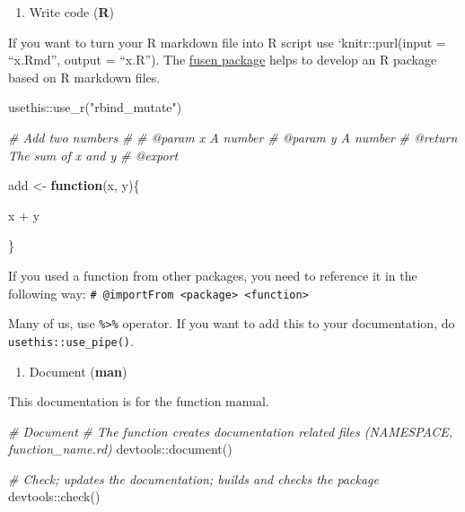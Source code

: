 \documentclass[
]{book}
\newenvironment{Shaded}{\begin{snugshade}}{\end{snugshade}}
\newcommand{\CommentTok}[1]{\textcolor[rgb]{0.56,0.35,0.01}{\textit{#1}}}
\newcommand{\ControlFlowTok}[1]{\textcolor[rgb]{0.13,0.29,0.53}{\textbf{#1}}}
\newcommand{\FunctionTok}[1]{\textcolor[rgb]{0.00,0.00,0.00}{#1}}
\newcommand{\NormalTok}[1]{#1}
\newcommand{\OtherTok}[1]{\textcolor[rgb]{0.56,0.35,0.01}{#1}}
\newcommand{\SpecialCharTok}[1]{\textcolor[rgb]{0.00,0.00,0.00}{#1}}
\newcommand{\StringTok}[1]{\textcolor[rgb]{0.31,0.60,0.02}{#1}}
\providecommand{\tightlist}{%
  \setlength{\itemsep}{0pt}\setlength{\parskip}{0pt}}
\begin{document}
\begin{enumerate}
\def\labelenumi{\arabic{enumi}.}
\setcounter{enumi}{1}
\tightlist
\item
  Write code (\textbf{R})
\end{enumerate}

If you want to turn your R markdown file into R script use `knitr::purl(input = ``x.Rmd'',
output = ``x.R''). The \href{https://thinkr-open.github.io/fusen/}{fusen package} helps to develop an R package based on R markdown files.

\begin{Shaded}
\begin{Highlighting}[]
\NormalTok{usethis}\SpecialCharTok{::}\FunctionTok{use\_r}\NormalTok{(}\StringTok{"rbind\_mutate"}\NormalTok{)}
\end{Highlighting}
\end{Shaded}

\begin{Shaded}
\begin{Highlighting}[]
\CommentTok{\#\textquotesingle{} Add two numbers}
\CommentTok{\#\textquotesingle{}}
\CommentTok{\#\textquotesingle{} @param x A number}
\CommentTok{\#\textquotesingle{} @param y A number}
\CommentTok{\#\textquotesingle{} @return The sum of x and y }
\CommentTok{\#\textquotesingle{} @export}

\NormalTok{add }\OtherTok{\textless{}{-}} \ControlFlowTok{function}\NormalTok{(x, y)\{}
  
\NormalTok{  x }\SpecialCharTok{+}\NormalTok{ y}
  
\NormalTok{\}}
\end{Highlighting}
\end{Shaded}

If you used a function from other packages, you need to reference it in the following way: \texttt{\#\textquotesingle{}\ @importFrom\ \textless{}package\textgreater{}\ \textless{}function\textgreater{}}

Many of us, use \texttt{\%\textgreater{}\%} operator. If you want to add this to your documentation, do \texttt{usethis::use\_pipe()}.

\begin{enumerate}
\def\labelenumi{\arabic{enumi}.}
\setcounter{enumi}{2}
\tightlist
\item
  Document (\textbf{man})
\end{enumerate}

This documentation is for the function manual.

\begin{Shaded}
\begin{Highlighting}[]
\CommentTok{\# Document }
\CommentTok{\# The function creates documentation related files (NAMESPACE, function\_name.rd)}
\NormalTok{devtools}\SpecialCharTok{::}\FunctionTok{document}\NormalTok{()}

\CommentTok{\# Check; updates the documentation; builds and checks the package }
\NormalTok{devtools}\SpecialCharTok{::}\FunctionTok{check}\NormalTok{()}
\end{Highlighting}
\end{Shaded}
\end{document}

